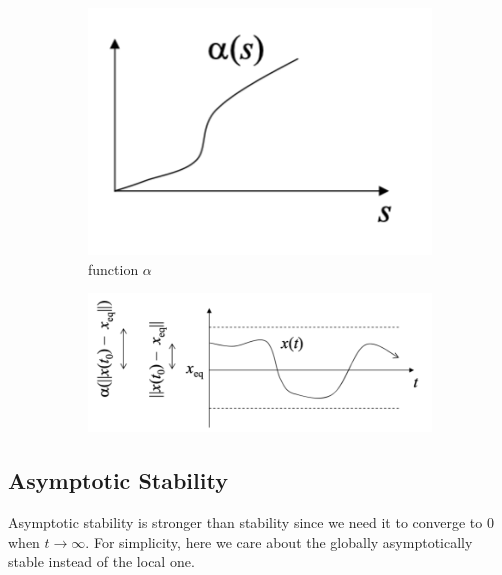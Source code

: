 \documentclass{article}
\begin{document}
\begin{figure}[H]
     \centering
     \begin{subfigure}[b]{0.3\textwidth}
         \centering
         \includegraphics[width=\textwidth]{Figs/3.png}
         \caption{function $\alpha$}
     \end{subfigure}
     \hfill
     \begin{subfigure}[b]{0.47\textwidth}
         \centering
         \includegraphics[width=\textwidth]{Figs/4.png}
     \end{subfigure}
\end{figure}

\subsection{Asymptotic Stability}
Asymptotic stability is stronger than stability since we need it to converge to $0$ when $t\rightarrow \infty$. For simplicity,
here we care about the globally asymptotically stable instead of the local one.
\end{document}
